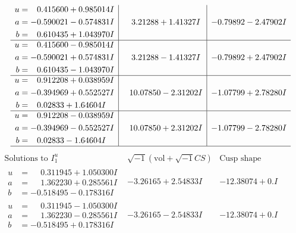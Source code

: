 \documentclass[1p]{elsarticle_modified}
\theoremstyle{definition}
\newcommand{\I}{\sqrt{-1}}
\begin{document}
$$\begin{array}{c|c|c}
\begin{aligned}
u &= \phantom{-}0.415600 + 0.985014 I \\
a &= -0.590021 - 0.574831 I \\
b &= \phantom{-}0.610435 + 1.043970 I\end{aligned}
 & \phantom{-}3.21288 + 1.41327 I & -0.79892 - 2.47902 I \\ \hline\begin{aligned}
u &= \phantom{-}0.415600 - 0.985014 I \\
a &= -0.590021 + 0.574831 I \\
b &= \phantom{-}0.610435 - 1.043970 I\end{aligned}
 & \phantom{-}3.21288 - 1.41327 I & -0.79892 + 2.47902 I \\ \hline\begin{aligned}
u &= \phantom{-}0.912208 + 0.038959 I \\
a &= -0.394969 + 0.552527 I \\
b &= \phantom{-}0.02833 + 1.64604 I\end{aligned}
 & \phantom{-}10.07850 - 2.31202 I & -1.07799 + 2.78280 I \\ \hline\begin{aligned}
u &= \phantom{-}0.912208 - 0.038959 I \\
a &= -0.394969 - 0.552527 I \\
b &= \phantom{-}0.02833 - 1.64604 I\end{aligned}
 & \phantom{-}10.07850 + 2.31202 I & -1.07799 - 2.78280 I\\
 \hline 
 \end{array}$$\newpage$$\begin{array}{c|c|c}  
\text{Solutions to }I^u_{1}& \I (\text{vol} + \sqrt{-1}CS) & \text{Cusp shape}\\
 \hline 
\begin{aligned}
u &= \phantom{-}0.311945 + 1.050300 I \\
a &= \phantom{-}1.362230 + 0.285561 I \\
b &= -0.518495 - 0.178316 I\end{aligned}
 & -3.26165 + 2.54833 I & -12.38074 + 0. I\phantom{ +0.000000I} \\ \hline\begin{aligned}
u &= \phantom{-}0.311945 - 1.050300 I \\
a &= \phantom{-}1.362230 - 0.285561 I \\
b &= -0.518495 + 0.178316 I\end{aligned}
 & -3.26165 - 2.54833 I & -12.38074 + 0. I\phantom{ +0.000000I} \\ \hline\begin{aligned}

\end{aligned}
\end{array}$$
\end{document}
